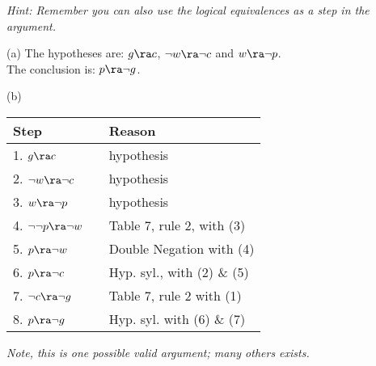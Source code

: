 \begin{questions}

\textit{Hint: Remember you can also use the logical equivalences as a step in the argument.}
    \ifprintanswers
        \vspace{-12pt}
    \fi
\begin{solution}
  (a) The hypotheses are: $g \ra c$, $\neg w \ra \neg c$ and $w \ra \neg p$. \\
  The conclusion is: $p \ra \neg g$.
  
  (b)

    \begin{tabular}{lll}
        Step    & \hspace{0.2in} & Reason \\
        \hline
        1. $g \ra c$                & & hypothesis \\
        2. $\neg w \ra \neg c$          & & hypothesis \\
        3. $w \ra \neg p$             & & hypothesis \\
        4. $\neg \neg p \ra \neg w$   & & Table 7, rule 2, with (3) \\
        5. $p \ra \neg w$       & & Double Negation with (4) \\
        6. $p \ra \neg c$               & & Hyp. syl., with (2) \& (5) \\
        7. $\neg c \ra \neg g$          & & Table 7, rule 2 with (1) \\
        8. $p \ra \neg g$       & & Hyp. syl. with (6) \& (7)
    \end{tabular}
    
    \emph{Note, this is one possible valid argument; many others exists.}


\end{solution}
\end{questions}
